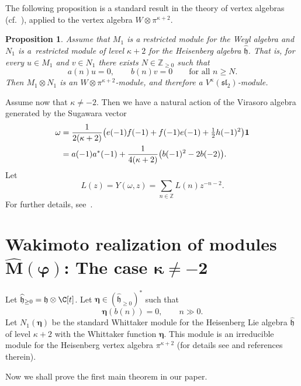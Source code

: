 \documentclass[pdftex]{sigma}
\numberwithin{equation}{section}
\newtheorem{Proposition}[Theorem]{Proposition}
\theoremstyle{definition}
\newcommand{\1}{\textbf{1}}
\begin{document}
The following proposition is a standard result in the theory of vertex algebras
(cf.~\cite{FB, K2, LL}), applied to the vertex algebra $W \otimes \pi^{\kappa+2}$.

\begin{Proposition}\label{constr-new1}
Assume that $M_{1}$ is a restricted module for the Weyl algebra and $N_{1}$ is a~restricted module of level $\kappa+2$ for the Heisenberg algebra $\widehat{\mathfrak{h}}$.
That is, for every $u \in M_{1}$ and $v \in N_{1}$ there exists $N \in \mathbb{Z}_{\ge 0}$ such that
\[
 a(n)u = 0, \qquad b(n)v = 0 \qquad \text{for all } n \ge N.
\]
Then $M_{1} \otimes N_{1}$ is an $W \otimes \pi^{\kappa+2}$-module, and therefore a
$V^{\kappa}(\mathfrak{sl}_{2})$-module.
\end{Proposition}

Assume now that $\kappa \ne -2$.
Then we have a natural action of the Virasoro algebra generated by the Sugawara vector
\begin{align*}
 \omega
 &= \frac{1}{2(\kappa + 2)}
 \big( e(-1)f(-1) + f(-1)e(-1) + \tfrac{1}{2}h(-1)^{2} \big){\bf 1} \\
 &= a(-1)a^{*}(-1)
 + \frac{1}{4(\kappa + 2)} \big( b(-1)^{2} - 2b(-2) \big).
\end{align*}
Let
\[
 L(z) = Y(\omega, z) = \sum_{n \in \mathbb{Z}} L(n) z^{-n-2}.
\]
For further details, see~\cite{FB}.

\section[Wakimoto realization of modules widehat M(varphi): The case kappa not = -2]{Wakimoto realization of modules $\boldsymbol{\widehat M(\varphi)}$: The case $\boldsymbol{\kappa \ne -2}$}

Let $\widehat{\mathfrak h}_{\ge 0} = {\mathfrak h} \otimes {\C}[t]$. Let $\bm{\eta} \in (\widehat{\mathfrak h}_{\ge 0}) ^* $ such that
 \[ \bm{\eta}(b (n)) = 0, \qquad n \gg 0. \]
Let $N_1 (\bm{\eta}) $ be the standard Whittaker module for the Heisenberg Lie algebra $\widehat{\mathfrak h}$ of level $\kappa +2$ with the Whittaker function $\bm{\eta}$. This module is an irreducible module for the Heisenberg vertex algebra $\pi^{\kappa+2}$ (for details see \cite{ALPY} and references therein).


Now we shall prove the first main theorem in our paper.
\end{document}
